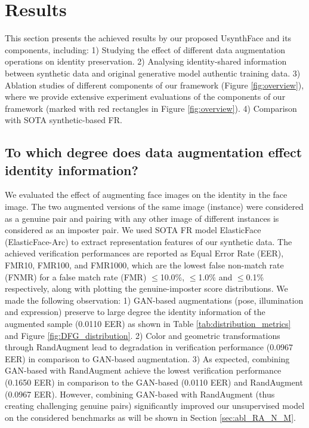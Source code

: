 \documentclass[10pt,twocolumn,letterpaper]{ieeeconf}
\begin{document}
\vspace{-2mm}
\section{Results}
This section presents the achieved results by our proposed UsynthFace and its components, including: 1) Studying the effect of different data augmentation operations on identity preservation. 2) Analysing identity-shared information between synthetic data and original generative model authentic training data. 3) Ablation studies of different components of our framework (Figure \ref{fig:overview}), where we provide extensive experiment evaluations of the components of our framework (marked with red rectangles in Figure \ref{fig:overview}). 4) Comparison with SOTA synthetic-based FR.  

\subsection{To which degree does data augmentation effect identity information?}
We evaluated the effect of augmenting face images on the identity in the face image. The two augmented versions of the same image (instance) were considered as a genuine pair and pairing with any other image of different instances is considered as an imposter pair.  We used SOTA FR model ElasticFace (ElasticFace-Arc) \cite{ElasticFace} to extract representation features of our synthetic data.  The achieved verification performances are reported as Equal Error Rate (EER), FMR10, FMR100, and FMR1000, which are the lowest false non-match rate (FNMR) for a false match rate (FMR) $\leq$10.0\%, $\leq$1.0\% and $\leq$0.1\% respectively, along with plotting the genuine-imposter score distributions.
We made the following observation: 1) GAN-based augmentations (pose, illumination and expression) preserve to large degree the identity information of the augmented sample (0.0110 EER) as shown in Table \ref{tab:distribution_metrics} and Figure \ref{fig:DFG_distribution}. 2) Color and geometric transformations through RandAugment lead to degradation in verification performance (0.0967 EER) in comparison to GAN-based augmentation. 3) As expected, combining GAN-based with RandAugment achieve the lowest verification performance (0.1650 EER) in comparison to the GAN-based (0.0110 EER) and RandAugment (0.0967 EER). However, combining GAN-based with RandAugment (thus creating challenging genuine pairs) significantly improved our unsupervised model on the considered benchmarks as will be shown in Section \ref{sec:abl_RA_N_M}.
\end{document}
